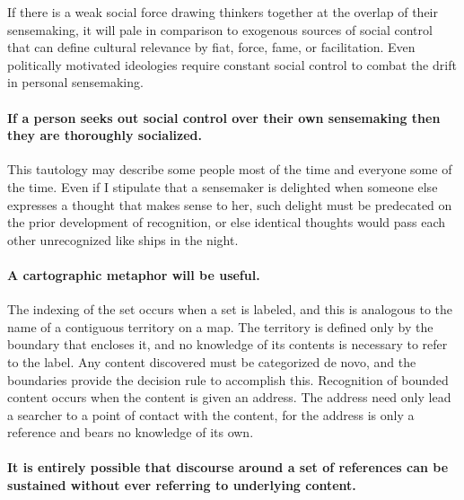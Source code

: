 \documentclass[]{article}
\begin{document}
If there is a weak social force drawing thinkers together at the overlap
of their sensemaking, it will pale in comparison to exogenous sources of
social control that can define cultural relevance by fiat, force, fame,
or facilitation. Even politically motivated ideologies require constant
social control to combat the drift in personal sensemaking.

\paragraph{If a person seeks out social control over their own
sensemaking then they are thoroughly
socialized.}\label{if-a-person-seeks-out-social-control-over-their-own-sensemaking-then-they-are-thoroughly-socialized.}

This tautology may describe some people most of the time and everyone
some of the time. Even if I stipulate that a sensemaker is delighted
when someone else expresses a thought that makes sense to her, such
delight must be predecated on the prior development of recognition, or
else identical thoughts would pass each other unrecognized like ships in
the night.

\paragraph{A cartographic metaphor will be
useful.}\label{a-cartographic-metaphor-will-be-useful.}

The indexing of the set occurs when a set is labeled, and this is
analogous to the name of a contiguous territory on a map. The territory
is defined only by the boundary that encloses it, and no knowledge of
its contents is necessary to refer to the label. Any content discovered
must be categorized de novo, and the boundaries provide the decision
rule to accomplish this. Recognition of bounded content occurs when the
content is given an address. The address need only lead a searcher to a
point of contact with the content, for the address is only a reference
and bears no knowledge of its own.

\paragraph{It is entirely possible that discourse around a set of
references can be sustained without ever referring to underlying
content.}\label{it-is-entirely-possible-that-discourse-around-a-set-of-references-can-be-sustained-without-ever-referring-to-underlying-content.}
\end{document}
